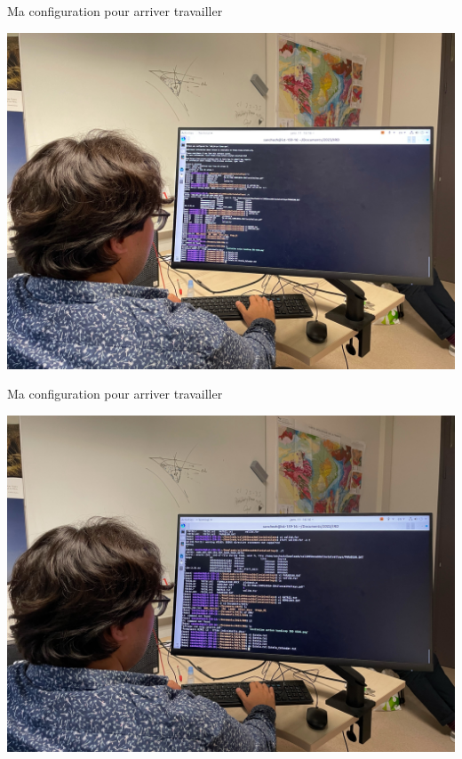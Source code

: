 \documentclass{beamer}
\begin{document}
\begin{frame}
 {Ma configuration pour arriver travailler}
 
  \includegraphics[width=1\linewidth]{images/photos/5/image4.jpeg}  
 
\end{frame}

\begin{frame}
 {Ma configuration pour arriver travailler}
 
  \includegraphics[width=1\linewidth]{images/photos/5/image3.jpeg}  
 
\end{frame}
\end{document}
